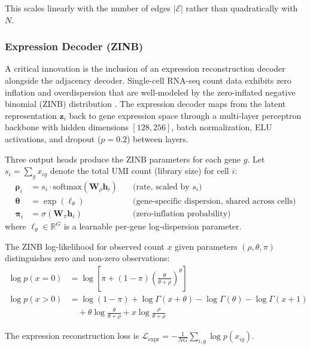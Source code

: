 \documentclass{article}
\begin{document}
This scales linearly with the number of edges $|\mathcal{E}|$ rather than quadratically with $N$.

\subsubsection{Expression Decoder (ZINB)}

A critical innovation is the inclusion of an expression reconstruction decoder alongside the adjacency decoder. Single-cell RNA-seq count data exhibits zero inflation and overdispersion that are well-modeled by the zero-inflated negative binomial (ZINB) distribution \citep{risso2018general}. The expression decoder maps from the latent representation $\mathbf{z}_i$ back to gene expression space through a multi-layer perceptron backbone with hidden dimensions $[128, 256]$, batch normalization, ELU activations, and dropout ($p = 0.2$) between layers.

Three output heads produce the ZINB parameters for each gene $g$. Let $s_i = \sum_g x_{ig}$ denote the total UMI count (library size) for cell $i$:
\begin{align}
\boldsymbol{\rho}_i &= s_i \cdot \text{softmax}(\mathbf{W}_\rho \mathbf{h}_i) \quad &\text{(rate, scaled by } s_i\text{)} \\
\boldsymbol{\theta} &= \exp(\boldsymbol{\ell}_\theta) \quad &\text{(gene-specific dispersion, shared across cells)} \\
\boldsymbol{\pi}_i &= \sigma(\mathbf{W}_\pi \mathbf{h}_i) \quad &\text{(zero-inflation probability)}
\end{align}
where $\boldsymbol{\ell}_\theta \in \mathbb{R}^G$ is a learnable per-gene log-dispersion parameter.

The ZINB log-likelihood for observed count $x$ given parameters $(\rho, \theta, \pi)$ distinguishes zero and non-zero observations:
\begin{align}
\log p(x = 0) &= \log\left[\pi + (1 - \pi) \left(\frac{\theta}{\theta + \rho}\right)^\theta\right] \\
\log p(x > 0) &= \log(1 - \pi) + \log \Gamma(x + \theta) - \log \Gamma(\theta) - \log \Gamma(x + 1) \nonumber \\
&\quad + \theta \log\frac{\theta}{\theta + \rho} + x \log\frac{\rho}{\theta + \rho}
\end{align}

The expression reconstruction loss is $\mathcal{L}_{\text{expr}} = -\frac{1}{NG}\sum_{i,g} \log p(x_{ig})$.
\end{document}
